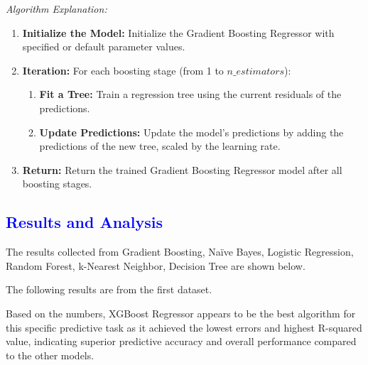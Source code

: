 \documentclass[conference]{IEEEtran}
\newcommand{\mar}[1]{\textcolor{blue}{#1}}
\begin{document}
\textit{Algorithm Explanation:}
\begin{enumerate}
    \item \textbf{Initialize the Model:} Initialize the Gradient Boosting Regressor with specified or default parameter values.
    \item \textbf{Iteration:} For each boosting stage (from 1 to $n\_estimators$):
        \begin{enumerate}
            \item \textbf{Fit a Tree:} Train a regression tree using the current residuals of the predictions.
            \item \textbf{Update Predictions:} Update the model's predictions by adding the predictions of the new tree, scaled by the learning rate.
        \end{enumerate}
    \item \textbf{Return:} Return the trained Gradient Boosting Regressor model after all boosting stages.
\end{enumerate}

     \mar{\section{\textbf{\large Results and Analysis}}} 
    \label{Results and analysis}
    
    
    The results collected from Gradient Boosting, Naïve Bayes, Logistic Regression, Random Forest, k-Nearest Neighbor, Decision Tree are shown below.
    
    The following results are from the first dataset.
    
    \label{stat}
    
   
    Based on the numbers, XGBoost Regressor appears to be the best algorithm for this specific predictive task as it achieved the lowest errors and highest R-squared value, indicating superior predictive accuracy and overall performance compared to the other models.
    
\end{document}
